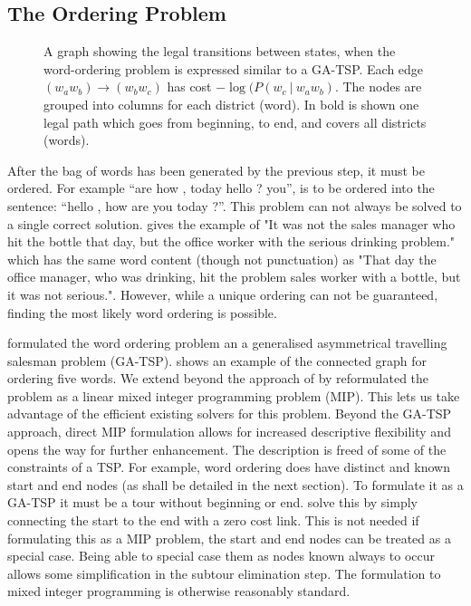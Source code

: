 \documentclass[11pt]{article}
\theoremstyle{plain}
\theoremstyle{definition}
\newcommand{\textcite}{\protect\newcite}
\begin{document}
\subsection{The Ordering Problem} \label{ordering}
\begin{figure*}
	\begin{center}
	
	\end{center}
	\caption{\label{fig:ordergraph} A graph showing the legal transitions between states, when the word-ordering problem is expressed similar to a GA-TSP. Each edge $(w_aw_b)\to (w_bw_c)$ has cost $-\log(P(w_c\:|\:w_aw_b)$. The nodes are grouped into columns for each district (word). In bold is shown one legal path which goes from beginning, to end, and covers all districts (words).} 
\end{figure*}

After the bag of words has been generated by the previous step, it must be ordered. For example ``are how , today hello ? you'', is to be ordered into the sentence: ``hello , how are you today ?''. This problem can not always be solved to a single correct solution. \textcite{Mitchell2008}  gives the example of "It was not the sales manager who hit the bottle that day, but the office worker with the serious drinking problem." which has the same word content (though not punctuation) as "That day the office manager, who was drinking, hit the problem sales worker with a bottle, but it was not serious.". However, while a unique ordering can not be guaranteed, finding the most likely word ordering is possible.

\textcite{Horvat2014} formulated the word ordering problem an a generalised asymmetrical travelling salesman problem (GA-TSP).  shows an example of the connected graph for ordering five words. We extend beyond the approach of \textcite{Horvat2014} by reformulated the problem as a linear mixed integer programming problem (MIP). This lets us take advantage of the efficient existing solvers for this problem. 
Beyond the GA-TSP approach, direct MIP formulation allows for increased descriptive flexibility and opens the way for further enhancement. The description is freed of some of the constraints of a TSP. For example, word ordering does have distinct and known start and end nodes (as shall be detailed in the next section). To formulate it as a GA-TSP it must be a tour without beginning or end. \textcite{Horvat2014} solve this by simply connecting the start to the end with a zero cost link. This is not needed if formulating this as a MIP problem, the start and end nodes can be treated as a special case. Being able to special case them as nodes known always to occur allows some simplification in the subtour elimination step. The formulation to mixed integer programming is otherwise reasonably standard.
\end{document}
